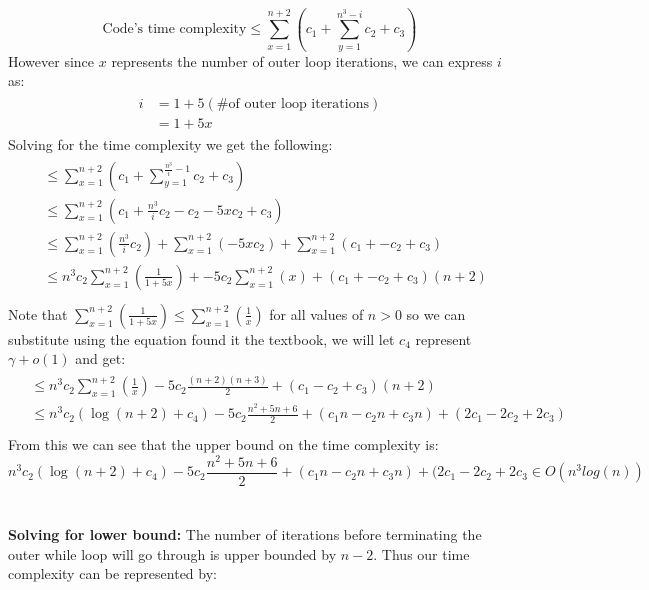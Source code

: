 \documentclass[12pt]{article}
\begin{document}
\begin{adjustwidth}{0em}{0pt}
\[ \text{Code's time complexity} \leq \sum^{n+2}_{x=1} \left( c_1 + \sum^{n^3-i}_{y=1}c_2 + c_3 \right) \]
However since $x$ represents the number of outer loop iterations, we can express $i$ as:
\begin{align*}
    \begin{aligned}
       i &= 1 + 5 (\text{\# of outer loop iterations}) \\
       &= 1 + 5x
    \end{aligned}
\end{align*}
Solving for the time complexity we get the following:
\begin{align*}
    \begin{aligned}
       &\leq \sum^{n+2}_{x=1} \left( c_1 + \sum^{\frac{n^3}{i} - 1}_{y=1}c_2 + c_3 \right) \\
       &\leq \sum^{n+2}_{x=1} \left( c_1 + \frac{n^3}{i}c_2-c_2-5xc_2 + c_3 \right) \\
       &\leq \sum^{n+2}_{x=1} \left(\frac{n^3}{i}c_2 \right) + \sum^{n+2}_{x=1} \left(-5xc_2 \right)  + \sum^{n+2}_{x=1} \left( c_1 + -c_2 + c_3  \right) \\
       &\leq n^3c_2\sum^{n+2}_{x=1} \left(\frac{1}{1+5x}\right) + -5c_2\sum^{n+2}_{x=1} \left(x \right) + ( c_1 + -c_2 + c_3  )(n+2) \\
    \end{aligned}
\end{align*}
Note that $\sum^{n+2}_{x=1} \left(\frac{1}{1+5x}\right) \leq \sum^{n+2}_{x=1} \left(\frac{1}{x}\right)$ for all values of $n>0$ so we can substitute using the equation found it the textbook, we will let $c_4$ represent $\gamma + o(1)$  and get:
\begin{align*}
    \begin{aligned}
       &\leq  n^3c_2\sum^{n+2}_{x=1} \left(\frac{1}{x}\right) -5c_2\frac{(n+2)(n+3)}{2} + ( c_1 - c_2 + c_3  )(n+2) \\
       &\leq  n^3c_2(\log(n+2) + c_4) -5c_2\frac{n^2 + 5n + 6}{2} + ( c_1n -c_2n + c_3n ) + (2c_1 -2c_2+2c_3) \\
    \end{aligned}
\end{align*}
From this we can see that the upper bound on the time complexity is:
\[  n^3c_2(\log(n+2) + c_4) -5c_2\frac{n^2 + 5n + 6}{2} + ( c_1n -c_2n + c_3n ) + (2c_1 -2c_2+2c_3 \in O(n^3log(n)) \] \\ \\
\textbf{Solving for lower bound:} The number of iterations before terminating the outer while loop will go through is upper bounded by $n-2$. Thus our time complexity can be represented by:

\end{adjustwidth}
\end{document}
